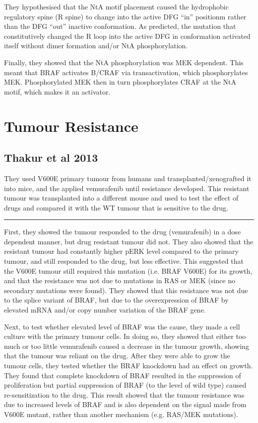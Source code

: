 \documentclass[a4paper,12pt]{article}
\begin{document}
They hypothesised that the NtA motif placement caused the hydrophobic regulatory spine (R spine) to change into the active DFG ``in'' positionm rather than the DFG ``out'' inactive conformation.
As predicted, the mutation that constitutively changed the R loop into the active DFG in conformation activated itself without dimer formation and/or NtA phosphorylation.

Finally, they showed that the NtA phosphorylation was MEK dependent.
This meant that BRAF activates B/CRAF via transactivation, which phosphorylates MEK.
Phosphorylated MEK then in turn phosphorylates CRAF at the NtA motif, which makes it an activator.

\section*{Tumour Resistance}

\subsection*{\normalsize{Thakur et al 2013}}

They used V600E primary tumour from humans and transplanted/xenografted it into mice, and the applied vemurafenib until resistance developed.
This resistant tumour was transplanted into a different mouse and used to test the effect of drugs and compared it with the WT tumour that is sensitive to the drug.

\noindent\rule{\textwidth}{0.4pt}

First, they showed the tumour responded to the drug (vemurafenib) in a dose dependent manner, but drug resistant tumour did not.
They also showed that the resistant tumour had constantly higher pERK level compared to the primary tumour, and still responded to the drug, but less effective.
This suggested that the V600E tumour still required this mutation (i.e. BRAF V600E) for its growth, and that the resistance was not due to mutations in RAS or MEK (since no secondary mutations were found).
They showed that this resistance was not due to the splice variant of BRAF, but due to the overexpression of BRAF by elevated mRNA and/or copy number variation of the BRAF gene.

Next, to test whether elevated level of BRAF was the cause, they made a cell culture with the primary tumour cells.
In doing so, they showed that either too much or too little vemurafenib caused a decrease in the tumour growth, showing that the tumour was reliant on the drug.
After they were able to grow the tumour cells, they tested whether the BRAF knockdown had an effect on growth.
They found that complete knockdown of BRAF resulted in the suppression of proliferation but partial suppression of BRAF (to the level of wild type) caused re-sensitization to the drug.
This result showed that the tumour resistance was due to increased levels of BRAF and is also dependent on the signal made from V600E mutant, rather than another mechanism (e.g. RAS/MEK mutations).
\end{document}
